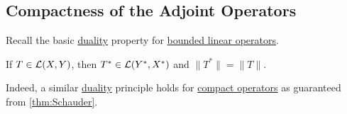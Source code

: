 \subsection{Compactness of the Adjoint Operators}
Recall the basic \hyperref[def:dual-space]{duality} property for \hyperref[def:bounded-linear-op]{bounded linear operators}.

\begin{prev}
	If \(T\in \mathcal{\MakeUppercase{l}} (X, Y)\), then \(T^{\ast} \in \mathcal{\MakeUppercase{l}} (Y^{\ast} , X^{\ast} )\) and \(\lVert T^{\ast}  \rVert = \lVert T \rVert \).
\end{prev}

Indeed, a similar \hyperref[def:dual-space]{duality} principle holds for \hyperref[def:compact-op]{compact operators} as guaranteed from \autoref{thm:Schauder}.

